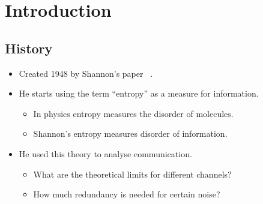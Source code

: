 


\section{Introduction}

\subsection{History}

\begin{frame}
  \begin{itemize}
    \item Created 1948 by Shannon's paper 
      ~\cite{Shannon1948amt}.

      \pause{}

    \item He starts using the term \enquote{entropy} as a measure for 
      information.
      \begin{itemize}
        \item In physics entropy measures the disorder of molecules.
        \item Shannon's entropy measures disorder of information.
      \end{itemize}

      \pause{}

    \item He used this theory to analyse communication.
      \begin{itemize}
        \item What are the theoretical limits for different channels?
        \item How much redundancy is needed for certain noise?
      \end{itemize}

  \end{itemize}
\end{frame}

